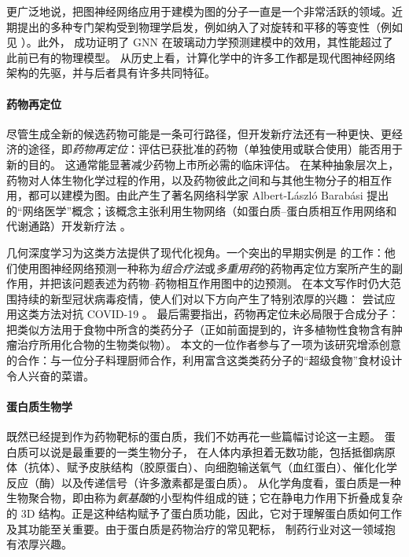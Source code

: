 更广泛地说，把图神经网络应用于建模为图的分子一直是一个非常活跃的领域。近期提出的多种专门架构受到物理学启发，例如纳入了对旋转和平移的等变性（例如见 \cite{thomas2018tensor,anderson2019cormorant,fuchs2020se,satorras2021n}）。此外，\citet{bapst2020unveiling} 成功证明了 GNN 在玻璃动力学预测建模中的效用，其性能超过了此前已有的物理模型。
%
从历史上看，计算化学中的许多工作都是现代图神经网络架构的先驱，并与后者具有许多共同特征。




\paragraph{药物再定位}
%
尽管生成全新的候选药物可能是一条可行路径，但开发新疗法还有一种更快、更经济的途径，即\emph{药物再定位}：评估已获批准的药物（单独使用或联合使用）能否用于新的目的。
%
这通常能显著减少药物上市所必需的临床评估。%
在某种抽象层次上，药物对人体生物化学过程的作用，以及药物彼此之间和与其他生物分子的相互作用，都可以建模为图。由此产生了著名网络科学家 Albert-L{\'a}szl{\'o} Barab{\'a}si 提出的“网络医学”概念；该概念主张利用生物网络（如蛋白质--蛋白质相互作用网络和代谢通路）开发新疗法 \citep{barabasi2011network}。


几何深度学习为这类方法提供了现代化视角。一个突出的早期实例是 \cite{zitnik2018modeling} 的工作：他们使用图神经网络预测一种称为\emph{组合疗法}或\emph{多重用药}的药物再定位方案所产生的副作用，并把该问题表述为药物--药物相互作用图中的边预测。
%
在本文写作时仍大范围持续的新型冠状病毒疫情，使人们对以下方向产生了特别浓厚的兴趣：%
尝试应用这类方法对抗 COVID-19 \citep{gysi2020network}。
%
最后需要指出，药物再定位未必局限于合成分子：\cite{veselkov2019hyperfoods} 把类似方法用于食物中所含的类药分子（正如前面提到的，许多植物性食物含有肿瘤治疗所用化合物的生物类似物）。
%
本文的一位作者参与了一项为该研究增添创意的合作：与一位分子料理厨师合作，利用富含这类类药分子的“超级食物”食材设计令人兴奋的菜谱。


\paragraph{蛋白质生物学}
既然已经提到作为药物靶标的蛋白质，我们不妨再花一些篇幅讨论这一主题。
%
蛋白质可以说是最重要的一类生物分子，
在人体内承担着无数功能，包括抵御病原体（抗体）、赋予皮肤结构（胶原蛋白）、向细胞输送氧气（血红蛋白）、催化化学反应（酶）以及传递信号（许多激素都是蛋白质）。
%
从化学角度看，蛋白质是一种生物聚合物，即由称为\emph{氨基酸}的小型构件组成的链；它在静电力作用下折叠成复杂的 3D 结构。正是这种结构赋予了蛋白质功能，因此，它对于理解蛋白质如何工作及其功能至关重要。由于蛋白质是药物治疗的常见靶标，%
制药行业对这一领域抱有浓厚兴趣。

